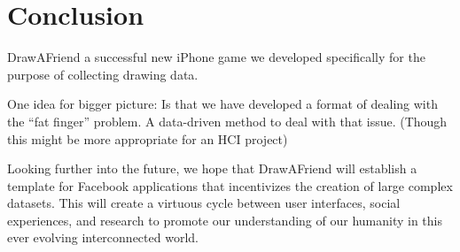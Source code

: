 \section{Conclusion}

DrawAFriend
a successful new iPhone game we developed specifically for the
purpose of collecting drawing data.

One idea for bigger picture: Is that we have developed a format of dealing with the ``fat finger'' problem. A data-driven method to deal with that issue. (Though this might be more appropriate for an HCI project)

Looking further into the future, we hope that DrawAFriend will establish a template for Facebook applications that incentivizes the creation of large complex datasets. This will create a virtuous cycle between user interfaces, social experiences, and research to promote our understanding of our humanity in this ever evolving interconnected world.
